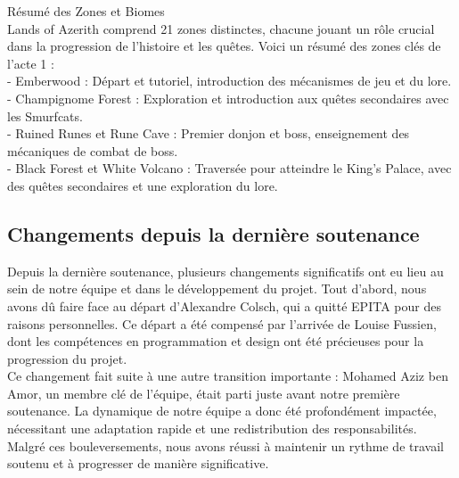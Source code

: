   

Résumé des Zones et Biomes 
\\
 

  

Lands of Azerith comprend 21 zones distinctes, chacune jouant un rôle crucial dans la progression de l'histoire et les quêtes. Voici un résumé des zones clés de l'acte 1 : 
\\
 
  

- Emberwood : Départ et tutoriel, introduction des mécanismes de jeu et du lore. 
\\
 

- Champignome Forest : Exploration et introduction aux quêtes secondaires avec les Smurfcats. 
\\
 

- Ruined Runes et Rune Cave : Premier donjon et boss, enseignement des mécaniques de combat de boss. 
\\
 

- Black Forest et White Volcano : Traversée pour atteindre le King's Palace, avec des quêtes secondaires et une exploration du lore. 
\\
 

 


\subsection{Changements depuis la dernière soutenance}

Depuis la dernière soutenance, plusieurs changements significatifs ont eu lieu au sein de notre équipe et dans le développement du projet. 
Tout d'abord, nous avons dû faire face au départ d'Alexandre Colsch, qui a quitté EPITA  pour des raisons personnelles. 
Ce départ a été compensé par l'arrivée de Louise Fussien, dont les compétences en programmation et design ont été précieuses pour la progression du projet.
\\

Ce changement fait suite à une autre transition importante : Mohamed Aziz ben Amor, un membre clé de l'équipe, était parti juste avant notre première soutenance. 
La dynamique de notre équipe a donc été profondément impactée, nécessitant une adaptation rapide et une redistribution des responsabilités.
\\

Malgré ces bouleversements, nous avons réussi à maintenir un rythme de travail soutenu et à progresser de manière significative.
\\

